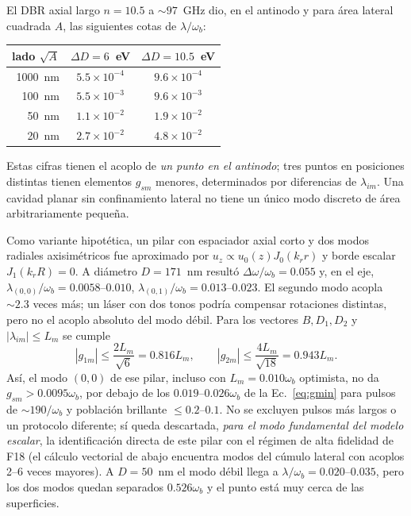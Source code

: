 \documentclass[11pt,a4paper]{article}
\newcommand{\wb}{\omega_b}
\begin{document}
El DBR axial largo $n=10.5$ a $\sim97$~GHz dio, en el antinodo y para
área lateral cuadrada $A$, las siguientes cotas de $\lambda/\omega_b$:
\begin{center}\small
\begin{tabular}{rcc}\toprule
lado $\sqrt A$ & $\Delta D=6$~eV & $\Delta D=10.5$~eV\\\midrule
1000~nm & $5.5\times10^{-4}$ & $9.6\times10^{-4}$\\
100~nm & $5.5\times10^{-3}$ & $9.6\times10^{-3}$\\
50~nm & $1.1\times10^{-2}$ & $1.9\times10^{-2}$\\
20~nm & $2.7\times10^{-2}$ & $4.8\times10^{-2}$\\\bottomrule
\end{tabular}
\end{center}
Estas cifras tienen el acoplo de \emph{un punto en el antinodo}; tres puntos
en posiciones distintas tienen elementos $g_{sm}$ menores, determinados
por diferencias de $\lambda_{im}$. Una cavidad planar sin confinamiento
lateral no tiene un único modo discreto de área arbitrariamente pequeña.

Como variante hipotética, un pilar con espaciador axial corto y dos modos
radiales axisimétricos fue aproximado por
$u_z\propto u_0(z)J_0(k_r r)$ y borde escalar $J_1(k_rR)=0$. A diámetro
$D=171$~nm resultó $\Delta\omega/\wb=0.055$ y, en el eje,
$\lambda_{(0,0)}/\wb=0.0058$--$0.010$,
$\lambda_{(0,1)}/\wb=0.013$--$0.023$.
El segundo modo acopla $\sim2.3$ veces más; un láser con dos tonos podría
compensar rotaciones distintas, pero no el acoplo absoluto del modo débil.
Para los vectores $B,D_1,D_2$ y $|\lambda_{im}|\le L_m$ se cumple
\begin{equation}
|g_{1m}|\le\frac{2L_m}{\sqrt6}=0.816L_m,\qquad
|g_{2m}|\le\frac{4L_m}{\sqrt{18}}=0.943L_m.
\label{eq:gbound}
\end{equation}
Así, el modo $(0,0)$ de ese pilar, incluso con $L_m=0.010\wb$
optimista, no da $g_{sm}>0.0095\wb$, por debajo de los
$0.019$--$0.026\wb$ de la Ec.~\eqref{eq:gmin} para pulsos de
$\sim190/\wb$ y población brillante $\le0.2$--$0.1$.
No se excluyen pulsos más largos o un protocolo diferente; sí queda
descartada, \emph{para el modo fundamental del modelo escalar}, la identificación directa de este pilar con el régimen de alta
fidelidad de F18 (el cálculo vectorial de abajo encuentra modos del cúmulo lateral con acoplos 2--6 veces mayores). A $D=50$~nm el modo débil llega a
$\lambda/\wb=0.020$--$0.035$, pero los dos modos quedan separados
$0.526\wb$ y el punto está muy cerca de las superficies.
\end{document}

